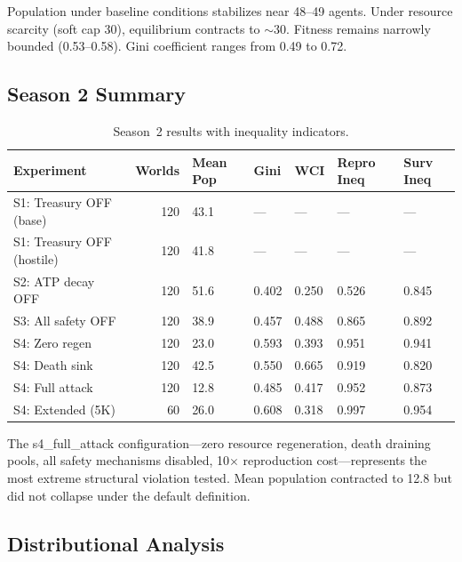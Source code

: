 \documentclass[11pt,a4paper]{article}
\begin{document}
Population under baseline conditions stabilizes near 48--49 agents. Under resource scarcity (soft cap 30), equilibrium contracts to $\sim$30. Fitness remains narrowly bounded (0.53--0.58). Gini coefficient ranges from 0.49 to 0.72.

\subsection{Season 2 Summary}

\begin{table}[H]
\centering
\caption{Season~2 results with inequality indicators.}
\small
\begin{tabular}{@{}lrlllll@{}}
\toprule
Experiment & Worlds & Mean Pop & Gini & WCI & Repro Ineq & Surv Ineq \\
\midrule
S1: Treasury OFF (base) & 120 & 43.1 & --- & --- & --- & --- \\
S1: Treasury OFF (hostile) & 120 & 41.8 & --- & --- & --- & --- \\
S2: ATP decay OFF & 120 & 51.6 & 0.402 & 0.250 & 0.526 & 0.845 \\
S3: All safety OFF & 120 & 38.9 & 0.457 & 0.488 & 0.865 & 0.892 \\
S4: Zero regen & 120 & 23.0 & 0.593 & 0.393 & 0.951 & 0.941 \\
S4: Death sink & 120 & 42.5 & 0.550 & 0.665 & 0.919 & 0.820 \\
S4: Full attack & 120 & 12.8 & 0.485 & 0.417 & 0.952 & 0.873 \\
S4: Extended (5K) & 60 & 26.0 & 0.608 & 0.318 & 0.997 & 0.954 \\
\bottomrule
\end{tabular}
\end{table}

The s4\_full\_attack configuration---zero resource regeneration, death draining pools, all safety mechanisms disabled, 10$\times$ reproduction cost---represents the most extreme structural violation tested. Mean population contracted to 12.8 but did not collapse under the default definition.

\subsection{Distributional Analysis}
\end{document}

